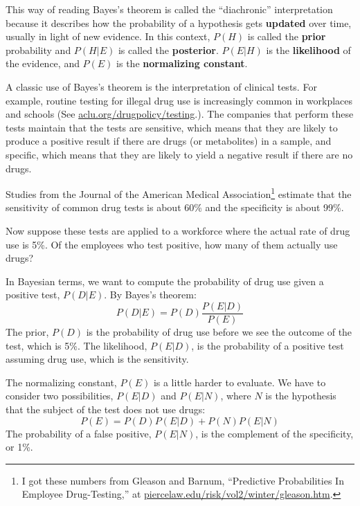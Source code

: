 \documentclass[12pt]{book}
\begin{document}

This way of reading Bayes's theorem is called the ``diachronic''
interpretation because it describes how the probability of a
hypothesis gets {\bf updated} over time, usually in light of new
evidence.  In this context, $P(H)$ is called the {\bf prior}
probability and $P(H|E)$ is called the {\bf posterior}.
$P(E|H)$ is the {\bf likelihood} of the evidence, and
$P(E)$ is the {\bf normalizing constant}.


A classic use of Bayes's theorem is the interpretation of clinical
tests.  For example, routine testing for illegal drug use is
increasingly common in workplaces and schools (See
\url{aclu.org/drugpolicy/testing}.).  The companies that
perform these tests maintain that the tests are sensitive, which means
that they are likely to produce a positive result if there are drugs
(or metabolites) in a sample, and specific, which means that they are
likely to yield a negative result if there are no drugs.


Studies from the Journal of the American Medical
Association\footnote{I got these numbers from Gleason and Barnum,
  ``Predictive Probabilities In Employee Drug-Testing,'' at
  \url{piercelaw.edu/risk/vol2/winter/gleason.htm}.} estimate that
the sensitivity of common drug tests is about 60\% and the specificity
is about 99\%.

Now suppose these tests are applied to a workforce where the
actual rate of drug use is 5\%.  Of the employees who test positive,
how many of them actually use drugs?

In Bayesian terms, we want to compute the probability of
drug use given a positive test, $P(D|E)$.  By Bayes's theorem:
%
\[ P(D|E) = P(D) \frac{P(E|D)}{P(E)} \]
%
The prior, $P(D)$ is the probability of drug use before we
see the outcome of the test, which is 5\%.
The likelihood, $P(E|D)$, is the probability
of a positive test assuming drug use, which is the sensitivity.

The normalizing constant, $P(E)$ is a little harder to evaluate.  We
have to consider two possibilities, $P(E|D)$ and $P(E|N)$, where $N$
is the hypothesis that the subject of the test does not use drugs:
%
\[ P(E) = P(D) P(E|D) + P(N) P(E|N) \]
%
The probability of a false positive, $P(E|N)$, is the complement
of the specificity, or 1\%.
\end{document}
